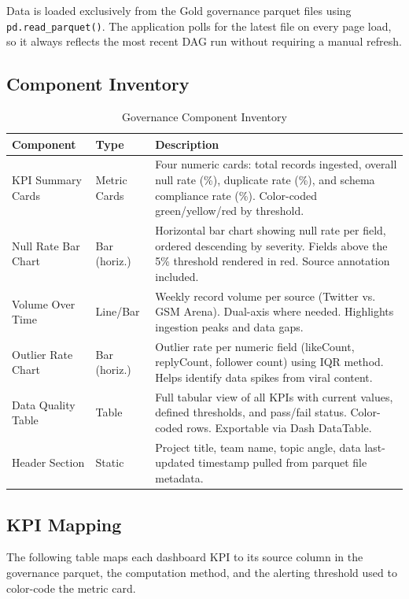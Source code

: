 \documentclass[12pt, a4paper]{article}
\begin{document}
Data is loaded exclusively from the Gold governance parquet files using \texttt{pd.read\_parquet()}. The application polls for the latest file on every page load, so it always reflects the most recent DAG run without requiring a manual refresh.

\subsection{Component Inventory}
\begin{table}[h]
\centering
\small
\renewcommand{\arraystretch}{1.3}
\begin{tabularx}{\textwidth}{l l X}
\toprule
\textbf{Component} & \textbf{Type} & \textbf{Description} \\
\midrule
KPI Summary Cards & Metric Cards & Four numeric cards: total records ingested, overall null rate (\%), duplicate rate (\%), and schema compliance rate (\%). Color-coded green/yellow/red by threshold. \\
Null Rate Bar Chart & Bar (horiz.) & Horizontal bar chart showing null rate per field, ordered descending by severity. Fields above the 5\% threshold rendered in red. Source annotation included. \\
Volume Over Time & Line/Bar & Weekly record volume per source (Twitter vs. GSM Arena). Dual-axis where needed. Highlights ingestion peaks and data gaps. \\
Outlier Rate Chart & Bar (horiz.) & Outlier rate per numeric field (likeCount, replyCount, follower count) using IQR method. Helps identify data spikes from viral content. \\
Data Quality Table & Table & Full tabular view of all KPIs with current values, defined thresholds, and pass/fail status. Color-coded rows. Exportable via Dash DataTable. \\
Header Section & Static & Project title, team name, topic angle, data last-updated timestamp pulled from parquet file metadata. \\
\bottomrule
\end{tabularx}
\caption{Governance Component Inventory}
\end{table}

\subsection{KPI Mapping}
The following table maps each dashboard KPI to its source column in the governance parquet, the computation method, and the alerting threshold used to color-code the metric card.
\end{document}
